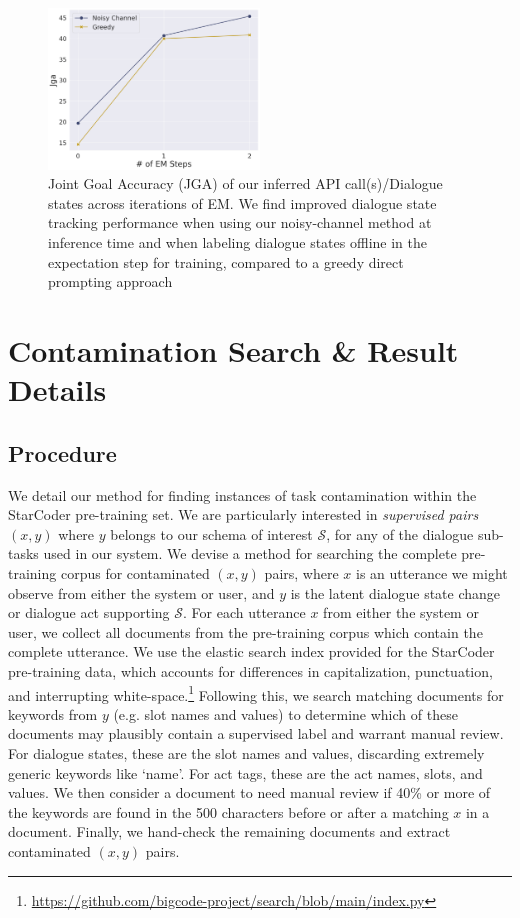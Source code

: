 \documentclass[11pt]{article}
\newcommand{\schema}[0]{\mathcal{S}}
\begin{document}
\begin{figure}
    \centering
    \includegraphics[width=0.5\textwidth]{imgs/step_plots_v3/jga_vs_steps.png}
    \caption{Joint Goal Accuracy (JGA) of our inferred API call(s)/Dialogue states across iterations of EM. We find improved dialogue state tracking performance when using our noisy-channel method at inference time and when labeling dialogue states offline in the expectation step for training, compared to a greedy direct prompting approach}
    \label{fig:app-jga-over-steps}
\end{figure}



\section{Contamination Search \& Result Details}
\label{app:contamination_details}

\subsection{Procedure} 

We detail our method for finding instances of task contamination within the StarCoder pre-training set.
We are particularly interested in \textit{supervised pairs $(x, y)$} where $y$ belongs to our schema of interest $\schema$, for any of the dialogue sub-tasks used in our system. 
We devise a method for searching the complete pre-training corpus for contaminated $(x, y)$ pairs, where $x$ is an utterance we might observe from either the system or user, and $y$ is the latent dialogue state change or dialogue act supporting $\schema$. 
For each utterance $x$ from either the system or user, we collect all documents from the pre-training corpus which contain the complete utterance. 
We use the elastic search index provided for the StarCoder pre-training data, which accounts for differences in capitalization, punctuation, and interrupting white-space.\footnote{\href{https://github.com/bigcode-project/search/blob/main/index.py}{https://github.com/bigcode-project/search/blob/main/index.py}} 
Following this, we search matching documents for keywords from $y$ (e.g. slot names and values) to determine which of these documents may plausibly contain a supervised label and warrant manual review. 
For dialogue states, these are the slot names and values, discarding extremely generic keywords like `name'.
For act tags, these are the act names, slots, and values.
We then consider a document to need manual review if 40\% or more of the keywords are found in the 500 characters before or after a matching $x$ in a document.
Finally, we hand-check the remaining documents and extract contaminated $(x, y)$ pairs.
\end{document}

